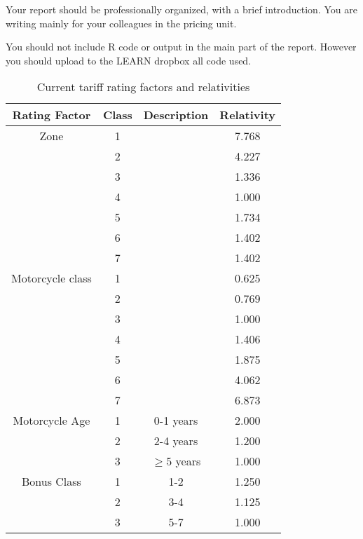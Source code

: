 \documentclass[11pt]{article}
\begin{document}
Your report should be professionally organized, with a brief introduction. You are writing mainly for your colleagues in the pricing unit.

You should not include R code or output in the main part of the report. However you should upload to the LEARN dropbox all code used.


\begin{table*}
  \caption{Current tariff rating factors and relativities}
  \begin{center}
\begin{tabular}{|c|c|c|c|}
\hline
Rating Factor & Class & Description & Relativity \\
\hline
Zone & 1 & &7.768\\
&2 & & 4.227 \\
&3&& 1.336 \\
&4&& 1.000 \\
&5& & 1.734 \\
& 6&& 1.402 \\
&7&&1.402 \\
\hline
Motorcycle class & 1& & 0.625 \\
&2&& 0.769 \\
&3&& 1.000 \\
&4& & 1.406 \\
&5&& 1.875 \\
&6&& 4.062 \\
&7&&6.873 \\
\hline
Motorcycle Age & 1 & 0-1 years & 2.000\\
&2&2-4 years & 1.200\\
&3& $\ge 5$ years & 1.000 \\
\hline
Bonus Class & 1 & 1-2 & 1.250 \\
&2& 3-4 & 1.125\\
&3& 5-7 & 1.000 \\
\hline
\end{tabular}
\end{center}
\end{table*}

\iffalse
You can use Excel to do the calculations for the second-to-last question, but you should not have to manually input any numbers (i.e., estimates produced by R) in the spreadsheet. That is, you should output from R the numbers you need for your Excel spreadsheet calculations.

\fi


 
\end{document}
